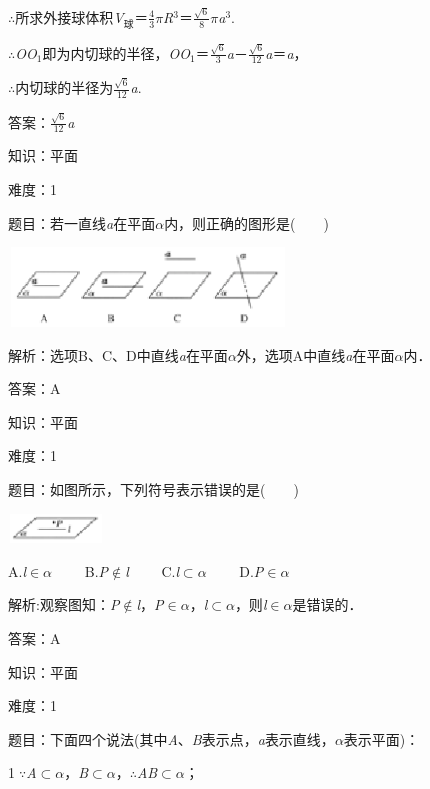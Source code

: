 \documentclass{article} %
\begin{document}
$\mathrm{\therefore}$所求外接球体积\textit{V}${}_{\textrm{球}}$＝$\frac{4}{3}\pi$\textit{R}${}^{3}$＝$\frac{\sqrt{6}}{8}\pi$\textit{a}${}^{3}$.

$\mathrm{\therefore}$\textit{OO}${}_{1}$即为内切球的半径，\textit{OO}${}_{1}$＝$\frac{\sqrt{6}}{3}$\textit{a}－$\frac{\sqrt{6}}{12}$\textit{a}＝\textit{a}，

$\mathrm{\therefore}$内切球的半径为$\frac{\sqrt{6}}{12}$\textit{a}.

答案：$\frac{\sqrt{6}}{12}$\textit{a}


知识：平面

难度：1

题目：若一直线\textit{a}在平面\textit{$\alpha$}内，则正确的图形是(　　)

\includegraphics*[width=2.92in, height=0.83in, keepaspectratio=false]{image84}

解析：选项B、C、D中直线\textit{a}在平面\textit{$\alpha$}外，选项A中直线\textit{a}在平面\textit{$\alpha$}内．

答案：A

知识：平面

难度：1

题目：如图所示，下列符号表示错误的是(　　)

\includegraphics*[width=1.00in, height=0.31in, keepaspectratio=false]{image85}

A.\textit{l}$\mathrm{\in}$\textit{$\alpha$}　　 B.\textit{P}$\mathrm{\notin}$\textit{l}　　 C.\textit{l}$\mathrm{\subset }$\textit{$\alpha$}　　 D.\textit{P}$\mathrm{\in}$\textit{$\alpha$}

解析:观察图知：\textit{P}$\mathrm{\notin}$\textit{l}，\textit{P}$\mathrm{\in}$\textit{$\alpha$}，\textit{l}$\mathrm{\subset }$\textit{$\alpha$}，则\textit{l}$\mathrm{\in}$\textit{$\alpha$}是错误的．

答案：A

知识：平面

难度：1

题目：下面四个说法(其中\textit{A}、\textit{B}表示点，\textit{a}表示直线，\textit{$\alpha$}表示平面)：

\textcircled{1}$\mathrm{\because}$\textit{A}$\mathrm{\subset }$\textit{$\alpha$}，\textit{B}$\mathrm{\subset }$\textit{$\alpha$}，$\mathrm{\therefore}$\textit{AB}$\mathrm{\subset }$\textit{$\alpha$}；
\end{document}
